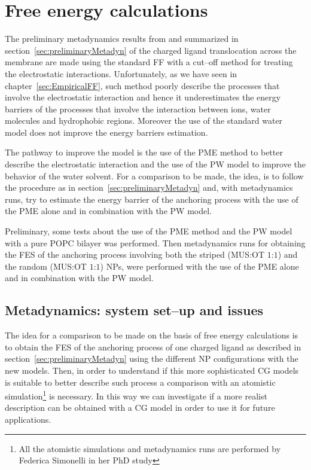 \chapter{Free energy calculations}

The preliminary metadynamics results from \cite{ourPaper} and summarized in section~\ref{sec:preliminaryMetadyn} of the charged ligand translocation across the membrane are made using the standard \martini \ac{FF} with a cut--off method for treating the electrostatic interactions. Unfortunately, as we have seen in chapter~\ref{sec:EmpiricalFF}, such method poorly describe the processes that involve the electrostatic interaction and hence it underestimates the energy barriers of the processes that involve the interaction between ions, water molecules and hydrophobic regions. Moreover the use of the standard \martini water model does not improve the energy barriers estimation.

The pathway to improve the model is the use of the \ac{PME} method to better describe the electrostatic interaction and the use of the \ac{PW} model to improve the behavior of the water solvent. For a comparison to be made, the idea, is to follow the procedure as in section~\ref{sec:preliminaryMetadyn} and, with metadynamics runs, try to estimate the energy barrier of the anchoring process with the use of the \ac{PME} alone and in combination with the \ac{PW} model. 

Preliminary, some tests about the use of the \ac{PME} method and the \ac{PW} model with a pure \ac{POPC} bilayer was performed. Then metadynamics runs for obtaining the \ac{FES} of the anchoring process involving both the striped (\ac{MUS}:\ac{OT} $1$:$1$) and the random (\ac{MUS}:\ac{OT} $1$:$1$) \acp{NP}, were performed with the use of the \ac{PME} alone and in combination with the \ac{PW} model. 

\section{Metadynamics: system set--up and issues}
The idea for a comparison to be made on the basis of free energy calculations is to obtain the \ac{FES} of the anchoring process of one charged ligand as described in section~\ref{sec:preliminaryMetadyn} using the different \ac{NP} configurations with the new \martini models. Then, in order to understand if this more sophisticated \ac{CG} models is suitable to better describe such process a comparison with an atomistic simulation\footnote{All the atomistic simulations and metadynamics runs are performed by Federica Simonelli in her PhD study} is necessary. In this way we can investigate if a more realist description can be obtained with a \ac{CG} model in order to use it for future applications.

